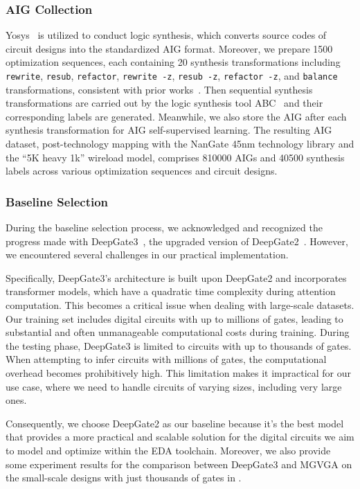 \subsubsection{AIG Collection}
\label{sec:aigs_collect}
Yosys~\citep{wolf2016yosys} is utilized to conduct logic synthesis, which converts source codes of circuit designs into the standardized AIG format.
Moreover, we prepare 1500 optimization sequences, each containing 20 synthesis transformations including \texttt{rewrite}, \texttt{resub}, \texttt{refactor}, \texttt{rewrite -z}, \texttt{resub -z}, \texttt{refactor -z}, and \texttt{balance} transformations, consistent with prior works~\citep{chowdhury2022bulls, zheng2024lstp}.
Then sequential synthesis transformations are carried out by the logic synthesis tool ABC~\citep{brayton2010abc} and their corresponding labels are generated.
Meanwhile, we also store the AIG after each synthesis transformation for AIG self-supervised learning.
The resulting AIG dataset, post-technology mapping with the NanGate 45nm technology library and the ``5K heavy 1k'' wireload model, comprises 810000 AIGs and 40500 synthesis labels across various optimization sequences and circuit designs.

\subsubsection{Baseline Selection}
\label{sec:baseline}

During the baseline selection process, we acknowledged and recognized the progress made with DeepGate3~\citep{shi2024deepgate3}, the upgraded version of DeepGate2~\citep{shi2023deepgate2}.
However, we encountered several challenges in our practical implementation.

Specifically, DeepGate3's architecture is built upon DeepGate2 and incorporates transformer models, which have a quadratic time complexity during attention computation. 
This becomes a critical issue when dealing with large-scale datasets. 
Our training set includes digital circuits with up to millions of gates, leading to substantial and often unmanageable computational costs during training. 
During the testing phase, DeepGate3 is limited to circuits with up to thousands of gates. 
When attempting to infer circuits with millions of gates, the computational overhead becomes prohibitively high. This limitation makes it impractical for our use case, where we need to handle circuits of varying sizes, including very large ones.

Consequently, we choose DeepGate2 as our baseline because it's the best model that provides a more practical and scalable solution for the digital circuits we aim to model and optimize within the EDA toolchain. 
Moreover, we also provide some experiment results for the comparison between DeepGate3 and MGVGA on the small-scale designs with just thousands of gates in .

